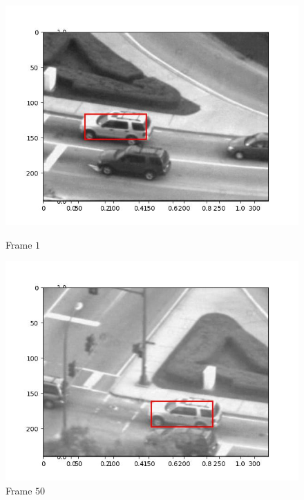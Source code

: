 \begin{figure}[H]
  \centering
  \begin{minipage}{.49\textwidth}
    \centering
    \includegraphics[width=\textwidth]{./figures/lk/car2/frame000001.jpg}
    \caption{Frame $1$}
  \end{minipage}
  \hfill
  \begin{minipage}{.49\textwidth}
    \centering
    \includegraphics[width=\textwidth]{./figures/lk/car2/frame000050.jpg}
    \caption{Frame $50$}
  \end{minipage}
  \hfill
  \begin{minipage}{.49\textwidth}
    \centering

\end{minipage}
\end{figure}
